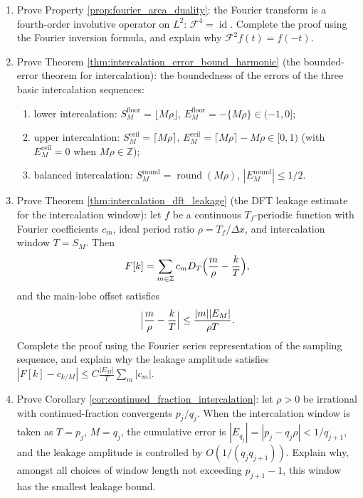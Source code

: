 \begin{enumerate}[leftmargin=3em, label=\textbf{Exercise \arabic*}]
    \item Prove Property \ref{prop:fourier_area_duality}:
    the Fourier transform is a fourth-order involutive operator on $L^2$: $\mathcal{F}^4=\operatorname{id}$.
    Complete the proof using the Fourier inversion formula, and explain why $\mathcal{F}^2f(t)=f(-t)$.

    \item Prove Theorem \ref{thm:intercalation_error_bound_harmonic} (the bounded-error theorem for intercalation):
    the boundedness of the errors of the three basic intercalation sequences:
    \begin{enumerate}[label=(\roman*)]
        \item lower intercalation: $S_M^{\mathrm{floor}}=\lfloor M\rho\rfloor$,
              $E_M^{\mathrm{floor}}=-\{M\rho\}\in(-1,0]$;
        \item upper intercalation: $S_M^{\mathrm{ceil}}=\lceil M\rho\rceil$,
              $E_M^{\mathrm{ceil}}=\lceil M\rho\rceil-M\rho\in[0,1)$ (with $E_M^{\mathrm{ceil}}=0$ when $M\rho\in\mathbb Z$);
        \item balanced intercalation: $S_M^{\mathrm{round}}=\operatorname{round}(M\rho)$,
              $|E_M^{\mathrm{round}}|\le1/2$.
    \end{enumerate}

    \item Prove Theorem \ref{thm:intercalation_dft_leakage} (the DFT leakage estimate for the intercalation window):
    let $f$ be a continuous $T_f$-periodic function with Fourier coefficients $c_m$,
    ideal period ratio $\rho=T_f/\Delta x$, and intercalation window $T=S_M$. Then
    \[
    F[k]=\sum_{m\in\mathbb{Z}}c_mD_T\Bigl(\frac{m}{\rho}-\frac{k}{T}\Bigr),
    \]
    and the main-lobe offset satisfies
    \[
    \Bigl|\frac{m}{\rho}-\frac{k}{T}\Bigr|
    \le\frac{|m||E_M|}{\rho T}.
    \]
    Complete the proof using the Fourier series representation of the sampling sequence,
    and explain why the leakage amplitude satisfies $|F[k]-c_{k/M}|\le C\frac{|E_M|}{T}\sum_m|c_m|$.

    \item Prove Corollary \ref{cor:continued_fraction_intercalation}:
    let $\rho>0$ be irrational with continued-fraction convergents $p_j/q_j$.
    When the intercalation window is taken as $T=p_j$, $M=q_j$,
    the cumulative error is $|E_{q_j}|=|p_j-q_j\rho|<1/q_{j+1}$,
    and the leakage amplitude is controlled by $O(1/(q_jq_{j+1}))$.
    Explain why, amongst all choices of window length not exceeding $p_{j+1}-1$,
    this window has the smallest leakage bound.


\end{enumerate}
